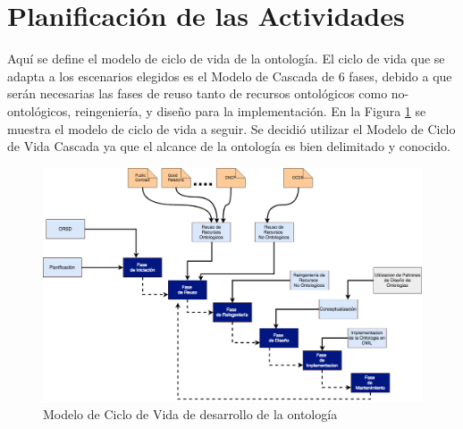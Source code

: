 \section{Planificación de las Actividades}

Aquí se define el modelo de ciclo de vida de la ontología. El ciclo de vida que se adapta a los escenarios elegidos es el Modelo de Cascada de 6 fases, debido a que serán necesarias las fases de reuso tanto de recursos ontológicos como no-ontológicos, reingeniería, y diseño para la implementación. En la Figura \ref{img:secuenciaDeDesarrollo} se muestra el modelo de ciclo de vida a seguir. Se decidió utilizar el Modelo de Ciclo de Vida Cascada ya que el alcance de la ontología es bien delimitado y conocido.

\begin{figure}[ht!]
    \centering
    \includegraphics[width=150mm]{figuras/Diagramas-GraficodeSecuenciasDesarrollo.png}
    \caption{Modelo de Ciclo de Vida de desarrollo de la ontología}
    \label{img:secuenciaDeDesarrollo}
\end{figure}

